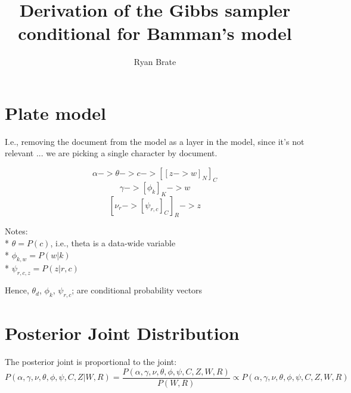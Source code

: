 \documentclass[a4paper]{article}
\title{Derivation of the Gibbs sampler conditional for Bamman's model}
\author{Ryan Brate}
\date{} %
\begin{document}
\setlength\parindent{0pt} %



\maketitle


\tableofcontents



% 

\section{Plate model}

I.e., removing the document from the model as a layer in the model, since it's not relevant ... we are picking a single character by document.

$$
\alpha -> \theta -> c -> [ [z -> w]_N ]_C
$$
$$
\gamma -> [\phi_k]_K -> w 
$$
$$
[\nu_r -> [\psi_{r,c}]_C ]_R -> z
$$

Notes:\\
* $\theta=P(c)$, i.e., theta is a data-wide variable\\
* $\phi_{k,w}=P(w|k)$\\
* $\psi_{r, c, z}=P(z|r,c)$

Hence, $\theta_{d}$, $\phi_{k}$, $\psi_{r, c}$; are conditional probability vectors



\section{Posterior Joint Distribution}

The posterior joint is proportional to the joint:
$$
P(\alpha, \gamma, \nu, \theta, \phi, \psi, C, Z | W, R) = \frac{P(\alpha, \gamma, \nu, \theta, \phi, \psi, C, Z, W, R)}{P(W,R)} \propto P(\alpha, \gamma, \nu, \theta, \phi, \psi, C, Z, W, R)
$$
\end{document}
